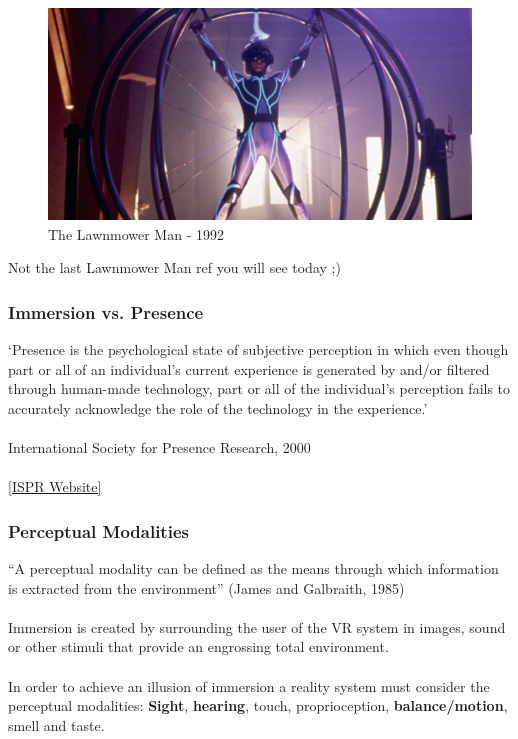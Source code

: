 \begin{frame}
	\begin{figure}
		\includegraphics[scale=.6]{assets/mower} 
		\caption{The Lawnmower Man - 1992}
	\end{figure}
	Not the last Lawnmower Man ref you will see today ;)
\end{frame}


\begin{frame}
	\frametitle{Immersion vs. Presence}
	
	`Presence is the psychological state of subjective perception in which even though part or all of an individual's current experience is generated by and/or filtered through human-made technology, part or all of the individual's perception fails to accurately acknowledge the role of the technology in the experience.' \\~\\
	
	International Society for Presence Research, 2000
	\\~\\
	\href{http://ispr.info}{[ISPR Website]}	
	
\end{frame}

\begin{frame}
	\frametitle{Perceptual Modalities}
	
	``A perceptual modality can be defined as the means through which information is extracted from the environment'' (James and Galbraith, 1985) \\~\\
	
	Immersion is created by surrounding the user of the VR system in images, sound or other stimuli that provide an engrossing total environment. \\~\\
	In order to achieve an illusion of immersion a reality system must consider the perceptual modalities: \textbf{Sight}, \textbf{hearing}, touch, proprioception, \textbf{balance/motion}, smell and taste. \\~\\
	
\end{frame}

